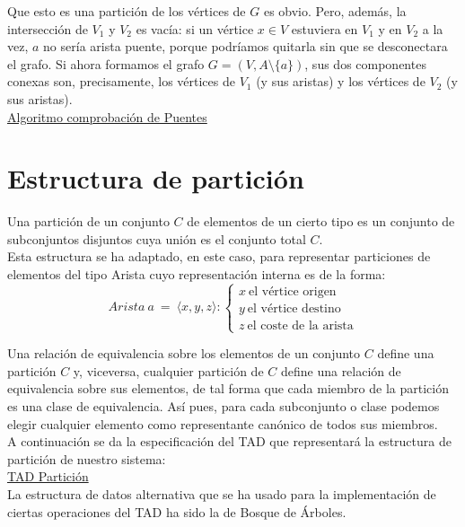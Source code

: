 Que esto es una partición de los vértices de $G$ es obvio. Pero, además, la intersección de $V_1$ y $V_2$ es vacía: si un vértice $x \in V$ estuviera en $V_1$ y en $V_2$ a la vez, $a$ no sería arista puente, porque podríamos quitarla sin que se desconectara el grafo. Si ahora formamos el grafo $G = (V, A \setminus \{a\})$, sus dos componentes conexas son, precisamente, los vértices de $V_1$ (y sus aristas) y los vértices de $V_2$ (y sus aristas).\\

\underline{Algoritmo comprobación de Puentes}\\



\section{Estructura de partición}

Una partición de un conjunto $C$ de elementos de un cierto tipo es un conjunto de subconjuntos disjuntos cuya unión es el conjunto total $C$.\\
Esta estructura se ha adaptado, en este caso, para representar particiones de elementos del tipo Arista cuyo representación interna es de la forma:
\[ Arista\ a\ =\ \langle x,y,z \rangle:
\left\{ 
\begin{array}{l}
x\ \mbox{el vértice origen}\\
y\ \mbox{el vértice destino}\\
z\ \mbox{el coste de la arista} 
\end{array}
\right. \]

Una relación de equivalencia sobre los elementos de un conjunto $C$ define una partición $C$ y, viceversa, cualquier partición de $C$ define una relación de equivalencia sobre sus elementos, de tal forma que cada miembro de la partición es una clase de equivalencia. Así pues, para cada subconjunto o clase podemos elegir cualquier elemento como representante canónico de todos sus miembros.\\

A continuación se da la especificación del TAD que representará la estructura de partición de nuestro sistema:\\

\underline{TAD Partición}\\


La estructura de datos alternativa que se ha usado para la implementación de ciertas operaciones del TAD ha sido la de Bosque de Árboles. \\

